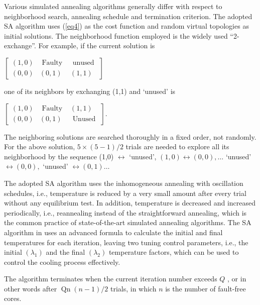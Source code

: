 Various simulated annealing algorithms generally differ with respect to neighborhood search, annealing schedule and termination criterion. The adopted SA algorithm uses (\ref{eq4}) as the cost function and random virtual topologies as initial solutions. The neighborhood function employed is the widely used “2-exchange”. For example, if the current solution is

\begin{center}
        $\left[\begin{array}{ccc}(1,0) & \text { Faulty } & \text { unused } \\ (0,0) & (0,1) & (1,1)\end{array}\right]$
\end{center}

one of its neighbors by exchanging (1,1) and ‘unused’ is

\begin{center}
        $\left[\begin{array}{ccc}(1,0) & \text { Faulty } & (1,1) \\ (0,0) & (0,1) & \text { Unused }\end{array}\right] .$
\end{center}

The neighboring solutions are searched thoroughly in a fixed order, not randomly. For the above solution, $5 \times(5-1) / 2$ trials are needed to explore all its neighborhood by the sequence (1,0)  $\leftrightarrow$ ‘unused’, $(1,0) \leftrightarrow(0,0), \ldots$ ‘unused’ $\leftrightarrow(0,0),$ ‘unused’ $\leftrightarrow(0,1) \ldots$

The adopted SA algorithm uses the inhomogeneous annealing with oscillation schedules, i.e., temperature is reduced by a very small amount after every trial without any equilibrium test. In addition, temperature is decreased and increased periodically, i.e., reannealing instead of the straightforward annealing, which is the common practice of state-of-the-art simulated annealing algorithms.
The SA algorithm in \cite{misevivcius2003modified} uses an advanced formula to calculate the initial and final temperatures for each iteration, leaving two tuning control parameters, i.e., the initial $\left(\lambda_{1}\right)$ and the final  $\left(\lambda_{2}\right)$ temperature factors, which can be used to control the cooling process effectively.

The algorithm terminates when the current iteration number exceeds $Q$ , or in other words after    $\operatorname{Qn}(n-1) / 2$ trials, in which $n$ is the number of fault-free cores.


